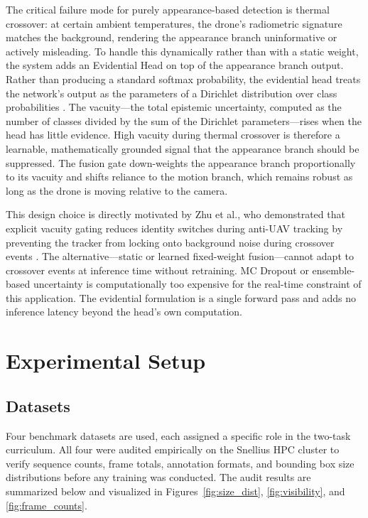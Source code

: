 The critical failure mode for purely appearance-based detection is thermal crossover: at certain ambient temperatures, the drone's radiometric signature matches the background, rendering the appearance branch uninformative or actively misleading. To handle this dynamically rather than with a static weight, the system adds an Evidential Head on top of the appearance branch output. Rather than producing a standard softmax probability, the evidential head treats the network's output as the parameters of a Dirichlet distribution over class probabilities \cite{sensoy2018evidential}. The vacuity---the total epistemic uncertainty, computed as the number of classes divided by the sum of the Dirichlet parameters---rises when the head has little evidence. High vacuity during thermal crossover is therefore a learnable, mathematically grounded signal that the appearance branch should be suppressed. The fusion gate down-weights the appearance branch proportionally to its vacuity and shifts reliance to the motion branch, which remains robust as long as the drone is moving relative to the camera.

This design choice is directly motivated by Zhu et al., who demonstrated that explicit vacuity gating reduces identity switches during anti-UAV tracking by preventing the tracker from locking onto background noise during crossover events \cite{zhu_evidential_2023}. The alternative---static or learned fixed-weight fusion---cannot adapt to crossover events at inference time without retraining. MC Dropout or ensemble-based uncertainty is computationally too expensive for the real-time constraint of this application. The evidential formulation is a single forward pass and adds no inference latency beyond the head's own computation.

\section{Experimental Setup}
\label{sec:experimental_setup}

\subsection{Datasets}
\label{sec:datasets}

Four benchmark datasets are used, each assigned a specific role in the two-task curriculum. All four were audited empirically on the Snellius HPC cluster to verify sequence counts, frame totals, annotation formats, and bounding box size distributions before any training was conducted. The audit results are summarized below and visualized in Figures~\ref{fig:size_dist}, \ref{fig:visibility}, and \ref{fig:frame_counts}.

